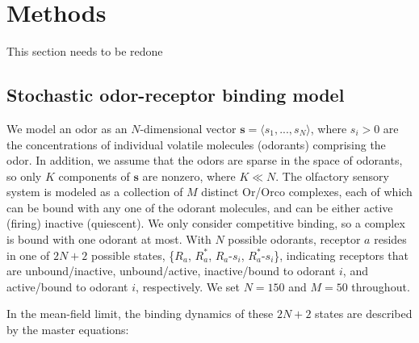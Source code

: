 \documentclass[9pt,twocolumn,twoside,lineno]{pnas-new}
\begin{document}

\section{Methods}

{\color {blue} This section needs to be redone}

\subsection{Stochastic odor-receptor binding model}

We model an odor as an $N$-dimensional vector $\mathbf s = \langle s_1,...,s_N\rangle$, where $s_i > 0$ are the concentrations of individual volatile molecules (odorants) comprising the odor. In addition, we assume that the odors are sparse in the space of odorants, so only $K$ components of $\mathbf s$ are nonzero, where $K \ll N$. The olfactory sensory system is modeled as a collection of $M$ distinct Or/Orco complexes, each of which can be bound with any one of the odorant molecules, and can be either active (firing) inactive (quiescent). We only consider competitive binding, so a complex is bound with one odorant at most. With $N$ possible odorants, receptor $a$ resides in one of $2N+2$ possible states, \{$R_a$, $R^*_a$, $R_a$-$s_i$, $R^*_a$-$s_i$\}, indicating receptors that are unbound/inactive, unbound/active, inactive/bound to odorant $i$, and active/bound to odorant $i$, respectively. We set $N = 150$ and $M = 50$ throughout.

In the mean-field limit, the binding dynamics of these $2N + 2$ states are described by the master equations:
\end{document}
